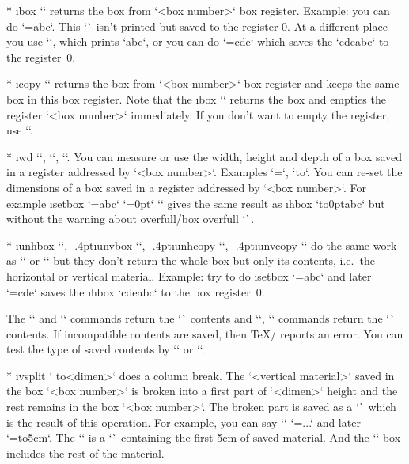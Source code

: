 {{* \i box `` returns the box from `<box number>` box
  register. Example: you can do `=\hbox{abc}`. This `\hbox` isn't
  printed but saved to the register 0. At a different place you use
  ``, which prints `\hbox{abc}`, or you can do
  `=\hbox{cde}` which saves the `\hbox{cde\hbox{abc}}`
  to the register~0.

* \i copy `` returns the box from
  `<box number>` box register and keeps the same box in this box register.
  Note that the \i box `` returns the
  box and empties the register `<box number>` immediately. If you don't want
  to empty the register, use `\copy`. 

* \i wd ``, ``, ``. You can
  measure or use the width, height and depth of a box saved in a register addressed
  by `<box number>`. Examples `\mydimen=`, `\hbox to`. 
  You can re-set the dimensions of a box saved in a register addressed by 
  `<box number>`. For example \i setbox `=\hbox{abc}` `=0pt` ``
  gives the same result as \i hbox `\hbox to0pt{abc}` but without the warning about
  \ii overfull/box overfull `\hbox`.

* \i unhbox ``, \kern-.4pt\i unvbox ``, 
  \kern-.4pt\i unhcopy ``, \kern-.4pt\i unvcopy ``
  do the same work as `\box` or `\copy` but they don't return the whole
  box but only its contents, i.e.~the horizontal or vertical material.
  Example: try to do \i setbox `=\hbox{abc}` and later 
  `=\hbox{cde}` saves
  the \i hbox `\hbox{cdeabc}` to the box register~0. 

  The \x`\unhbox` and \x`\unhcopy` commands return the \x`\hbox` contents and 
  \x`\unvbox`, \x`\unvcopy` commands return the \x`\vbox` contents. If incompatible
  contents are saved, then \TeX/ reports an error. You can test the type of
  saved contents by \x`\ifhbox` or \x`\ifvbox`.

* \i vsplit ` to<dimen>` does a column break. 
  The `<vertical material>` saved in the box `<box number>` is broken
  into a first part of `<dimen>` height and the rest remains in the
  box `<box number>`. The broken part is saved as a `\vbox` which is the
  result of this operation. For example, you can say `\newbox\column`
  `\setbox\column=\vbox{...}` and later 
  `=\vsplit\column to5cm`. The `` is a `\vbox` containing the first 5cm of
  saved material. And the `\column` box includes the rest of the material.

}}

